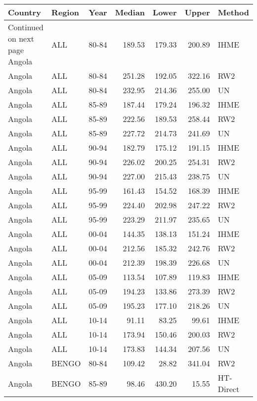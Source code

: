 \begin{longtable}{lllrrrl}
  \hline
Country & Region & Year & Median & Lower & Upper & Method \\ 
  \hline 
\endhead 
\hline 
{\footnotesize Continued on next page} 
\endfoot 
\endlastfoot 
Angola & ALL & 80-84 & 189.53 & 179.33 & 200.89 & IHME \\ 
  Angola & ALL & 80-84 & 251.28 & 192.05 & 322.16 & RW2 \\ 
  Angola & ALL & 80-84 & 232.95 & 214.36 & 255.00 & UN \\ 
  Angola & ALL & 85-89 & 187.44 & 179.24 & 196.32 & IHME \\ 
  Angola & ALL & 85-89 & 222.56 & 189.53 & 258.44 & RW2 \\ 
  Angola & ALL & 85-89 & 227.72 & 214.73 & 241.69 & UN \\ 
  Angola & ALL & 90-94 & 182.79 & 175.12 & 191.15 & IHME \\ 
  Angola & ALL & 90-94 & 226.02 & 200.25 & 254.31 & RW2 \\ 
  Angola & ALL & 90-94 & 227.00 & 215.43 & 238.75 & UN \\ 
  Angola & ALL & 95-99 & 161.43 & 154.52 & 168.39 & IHME \\ 
  Angola & ALL & 95-99 & 224.40 & 202.98 & 247.22 & RW2 \\ 
  Angola & ALL & 95-99 & 223.29 & 211.97 & 235.65 & UN \\ 
  Angola & ALL & 00-04 & 144.35 & 138.13 & 151.24 & IHME \\ 
  Angola & ALL & 00-04 & 212.56 & 185.32 & 242.76 & RW2 \\ 
  Angola & ALL & 00-04 & 212.39 & 198.39 & 226.68 & UN \\ 
  Angola & ALL & 05-09 & 113.54 & 107.89 & 119.83 & IHME \\ 
  Angola & ALL & 05-09 & 194.23 & 133.86 & 273.39 & RW2 \\ 
  Angola & ALL & 05-09 & 195.23 & 177.10 & 218.26 & UN \\ 
  Angola & ALL & 10-14 & 91.11 & 83.25 & 99.61 & IHME \\ 
  Angola & ALL & 10-14 & 173.94 & 150.46 & 200.03 & RW2 \\ 
  Angola & ALL & 10-14 & 173.83 & 144.34 & 207.56 & UN \\ 
  Angola & BENGO & 80-84 & 109.42 & 28.82 & 341.04 & RW2 \\ 
  Angola & BENGO & 85-89 & 98.46 & 430.20 & 15.55 & HT-Direct \\ 

\end{longtable}
